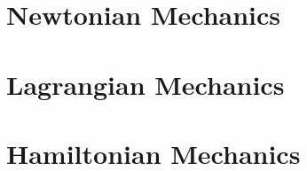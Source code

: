 \documentclass[11pt,openany]{book}
\begin{document}
    \prefrontmatter
    \frontmatter
    
    \thispagestyle{empty} 
    \tableofcontents \thispagestyle{empty} 
    \mainmatter
    \part{Newtonian Mechanics}
    

    

    \part{Lagrangian Mechanics}
    

    

    

    

    \part{Hamiltonian Mechanics}
    

    

    

    

    \renewcommand{\sectionmark}[1]{\markright{#1}}
    
    

    \appendix
    
\end{document}
